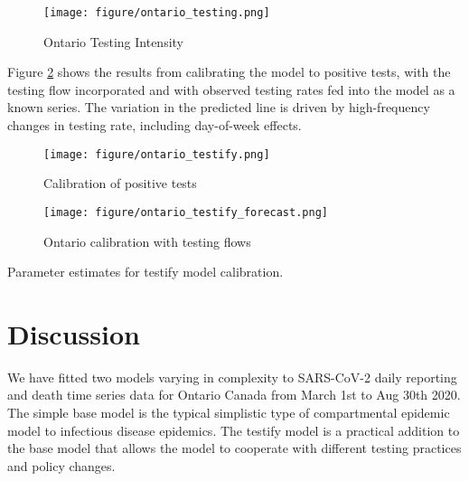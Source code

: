 \documentclass[12pt]{article}\usepackage[]{graphicx}\usepackage[]{color}
\begin{document}
\begin{figure}[ht!]
\texttt{[image: figure/ontario\_testing.png]}


\caption{Ontario Testing Intensity}
\label{fig:Ont_testing}
\end{figure}

\FloatBarrier

Figure \ref{fig:Ont_calibration_testify} shows the results from calibrating the model to positive tests, with the testing flow incorporated and with observed testing rates fed into the model as a known series.
The variation in the predicted line is driven by high-frequency changes in testing rate, including day-of-week effects.

\begin{figure}[ht!]
\texttt{[image: figure/ontario\_testify.png]}

\caption{Calibration of positive tests  }
\label{fig:Ont_calibration_testify}
\end{figure}

\begin{figure}[ht!]
\texttt{[image: figure/ontario\_testify\_forecast.png]}

\caption{Ontario calibration with testing flows}
\label{fig:Ont_calibration_testify_forecast}
\end{figure}


\begin{table}
\centering

\caption{Parameter estimates for testify model calibration. }
\label{table:testify}

\end{table}

\FloatBarrier

\section{Discussion}

We have fitted two models varying in complexity to SARS-CoV-2 daily reporting and death time series data for Ontario Canada from March 1st to Aug 30th 2020. 
The simple base model is the typical simplistic type of compartmental epidemic model to infectious disease epidemics. 
The testify model is a practical addition to the base model that allows the model to cooperate with different testing practices and policy changes.
\end{document}
